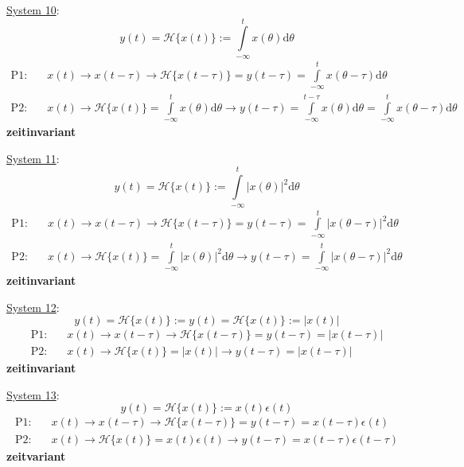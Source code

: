 \documentclass[11pt,a4paper,DIV=12]{scrartcl}
\numberwithin{equation}{section}
\numberwithin{figure}{section}
\newcommand\fsd{\mathrm{d}} %
\newcommand{\sysH}[1]{\mathcal{H}{\{#1\}}}
\begin{document}
\begin{Loesung}
\item  \underline{System 10}:
\begin{equation}
y(t) = \sysH{x(t)}:= \int\limits_{-\infty}^{t} x(\theta) \fsd \theta
\end{equation}
\begin{align}
\text{P1:}& \quad x(t)\rightarrow x(t-\tau)\rightarrow \mathcal{H}\{x(t-\tau)\}=y(t-\tau)=\int\limits_{-\infty}^{t} x(\theta-\tau) \fsd \theta\\
\text{P2:}& \quad x(t)\rightarrow \mathcal{H}\{x(t)\}=\int\limits_{-\infty}^{t} x(\theta) \fsd \theta\rightarrow y(t-\tau)=
\int\limits_{-\infty}^{t-\tau} x(\theta) \fsd \theta = \int\limits_{-\infty}^{t} x(\theta-\tau) \fsd \theta
\end{align}
\textbf{zeitinvariant}

\item  \underline{System 11}:
\begin{equation}
y(t) = \sysH{x(t)}:= \int\limits_{-\infty}^{t} |x(\theta)|^2 \fsd \theta
\end{equation}
\begin{align}
\text{P1:}& \quad x(t)\rightarrow x(t-\tau)\rightarrow \mathcal{H}\{x(t-\tau)\}=y(t-\tau)=\int\limits_{-\infty}^{t} |x(\theta-\tau)|^2 \fsd \theta\\
\text{P2:}& \quad x(t)\rightarrow \mathcal{H}\{x(t)\}=\int\limits_{-\infty}^{t} |x(\theta)|^2 \fsd \theta\rightarrow y(t-\tau)=\int\limits_{-\infty}^{t} |x(\theta-\tau)|^2 \fsd \theta
\end{align}
\textbf{zeitinvariant}


\item  \underline{System 12}:
\begin{equation}
y(t) = \sysH{x(t)}:= y(t) = \sysH{x(t)}:= |x(t)|
\end{equation}
\begin{align}
\text{P1:}& \quad x(t)\rightarrow x(t-\tau)\rightarrow \mathcal{H}\{x(t-\tau)\}=y(t-\tau)=|x(t-\tau)|\\
\text{P2:}& \quad x(t)\rightarrow \mathcal{H}\{x(t)\}=|x(t)|\rightarrow y(t-\tau) = |x(t-\tau)|
\end{align}
\textbf{zeitinvariant}

\item  \underline{System 13}:
\begin{equation}
y(t) = \sysH{x(t)}:= x(t) \epsilon(t)
\end{equation}
\begin{align}
\text{P1:}& \quad x(t)\rightarrow x(t-\tau)\rightarrow \mathcal{H}\{x(t-\tau)\}=y(t-\tau)=x(t-\tau) \epsilon(t)\\
\text{P2:}& \quad x(t)\rightarrow \mathcal{H}\{x(t)\}=x(t) \epsilon(t) \rightarrow y(t-\tau)=x(t-\tau) \epsilon(t-\tau)
\end{align}
\textbf{zeitvariant}


\end{Loesung}
\end{document}
